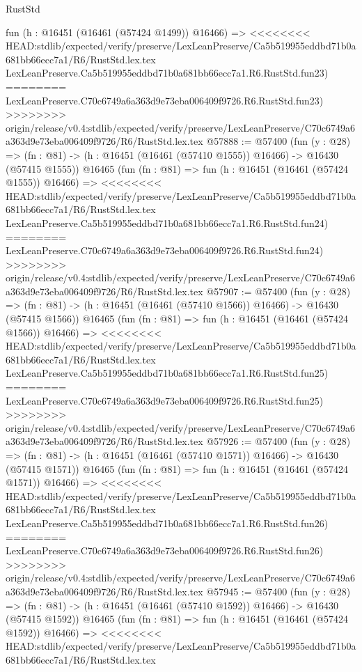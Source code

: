 \begin{lexlean}{RustStd}
\begin{coremodule}
{\begin{coremodule}
{{{{{{{{{{{{{{{{{{{{{{{{{{{{{{{{{{{{{{{{{{{{{{{{{{{{{{{    fun (h : @16451 (@16461 (@57424 @1499)) @16466) =>
<<<<<<<< HEAD:stdlib/expected/verify/preserve/LexLeanPreserve/Ca5b519955eddbd71b0a681bb66ecc7a1/R6/RustStd.lex.tex
    LexLeanPreserve.Ca5b519955eddbd71b0a681bb66ecc7a1.R6.RustStd.fun23)
========
    LexLeanPreserve.C70c6749a6a363d9e73eba006409f9726.R6.RustStd.fun23)
>>>>>>>> origin/release/v0.4:stdlib/expected/verify/preserve/LexLeanPreserve/C70c6749a6a363d9e73eba006409f9726/R6/RustStd.lex.tex
@57888 := @57400
    (fun (y : @28) =>
    (fn : @81) -> (h : @16451 (@16461 (@57410 @1555)) @16466) -> @16430 (@57415 @1555))
    @16465
    (fun (fn : @81) =>
    fun (h : @16451 (@16461 (@57424 @1555)) @16466) =>
<<<<<<<< HEAD:stdlib/expected/verify/preserve/LexLeanPreserve/Ca5b519955eddbd71b0a681bb66ecc7a1/R6/RustStd.lex.tex
    LexLeanPreserve.Ca5b519955eddbd71b0a681bb66ecc7a1.R6.RustStd.fun24)
========
    LexLeanPreserve.C70c6749a6a363d9e73eba006409f9726.R6.RustStd.fun24)
>>>>>>>> origin/release/v0.4:stdlib/expected/verify/preserve/LexLeanPreserve/C70c6749a6a363d9e73eba006409f9726/R6/RustStd.lex.tex
@57907 := @57400
    (fun (y : @28) =>
    (fn : @81) -> (h : @16451 (@16461 (@57410 @1566)) @16466) -> @16430 (@57415 @1566))
    @16465
    (fun (fn : @81) =>
    fun (h : @16451 (@16461 (@57424 @1566)) @16466) =>
<<<<<<<< HEAD:stdlib/expected/verify/preserve/LexLeanPreserve/Ca5b519955eddbd71b0a681bb66ecc7a1/R6/RustStd.lex.tex
    LexLeanPreserve.Ca5b519955eddbd71b0a681bb66ecc7a1.R6.RustStd.fun25)
========
    LexLeanPreserve.C70c6749a6a363d9e73eba006409f9726.R6.RustStd.fun25)
>>>>>>>> origin/release/v0.4:stdlib/expected/verify/preserve/LexLeanPreserve/C70c6749a6a363d9e73eba006409f9726/R6/RustStd.lex.tex
@57926 := @57400
    (fun (y : @28) =>
    (fn : @81) -> (h : @16451 (@16461 (@57410 @1571)) @16466) -> @16430 (@57415 @1571))
    @16465
    (fun (fn : @81) =>
    fun (h : @16451 (@16461 (@57424 @1571)) @16466) =>
<<<<<<<< HEAD:stdlib/expected/verify/preserve/LexLeanPreserve/Ca5b519955eddbd71b0a681bb66ecc7a1/R6/RustStd.lex.tex
    LexLeanPreserve.Ca5b519955eddbd71b0a681bb66ecc7a1.R6.RustStd.fun26)
========
    LexLeanPreserve.C70c6749a6a363d9e73eba006409f9726.R6.RustStd.fun26)
>>>>>>>> origin/release/v0.4:stdlib/expected/verify/preserve/LexLeanPreserve/C70c6749a6a363d9e73eba006409f9726/R6/RustStd.lex.tex
@57945 := @57400
    (fun (y : @28) =>
    (fn : @81) -> (h : @16451 (@16461 (@57410 @1592)) @16466) -> @16430 (@57415 @1592))
    @16465
    (fun (fn : @81) =>
    fun (h : @16451 (@16461 (@57424 @1592)) @16466) =>
<<<<<<<< HEAD:stdlib/expected/verify/preserve/LexLeanPreserve/Ca5b519955eddbd71b0a681bb66ecc7a1/R6/RustStd.lex.tex
}}}}}}}}}}}}}}}}}}}}}}}}}}}}}}}}}}}}}}}}}}}}}}}}}}}}}}}
\end{coremodule}}
\end{coremodule}
\end{lexlean}
